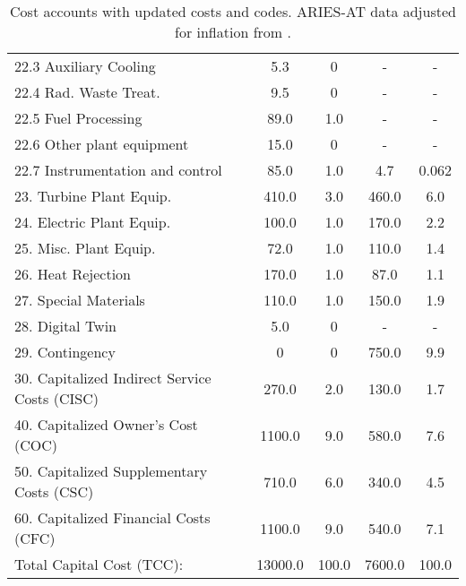 \begin{table}[h!]
{\begin{tabular}{lcccc}
\hspace{10mm}22.3 Auxiliary Cooling & 5.3 & 0 & - & - \\
\hspace{10mm}22.4 Rad. Waste Treat. & 9.5 & 0 & - & - \\
\hspace{10mm}22.5 Fuel Processing & 89.0 & 1.0 & - & - \\
\hspace{10mm}22.6 Other plant equipment & 15.0 & 0 & - & - \\
\hspace{10mm}22.7 Instrumentation and control & 85.0 & 1.0 & 4.7 & 0.062 \\
\hspace{5mm}23. Turbine Plant Equip. & 410.0 & 3.0 & 460.0 & 6.0 \\
\hspace{5mm}24. Electric Plant Equip. & 100.0 & 1.0 & 170.0 & 2.2 \\
\hspace{5mm}25. Misc. Plant Equip. & 72.0 & 1.0 & 110.0 & 1.4 \\
\hspace{5mm}26. Heat Rejection & 170.0 & 1.0 & 87.0 & 1.1 \\
\hspace{5mm}27. Special Materials & 110.0 & 1.0 & 150.0 & 1.9 \\
\hspace{5mm}28. Digital Twin & 5.0 & 0 & - & - \\
\hspace{5mm}29. Contingency & 0 & 0 & 750.0 & 9.9 \\
30. Capitalized Indirect Service Costs (CISC) & 270.0 & 2.0 & 130.0 & 1.7 \\
40. Capitalized Owner’s Cost (COC) & 1100.0 & 9.0 & 580.0 & 7.6 \\
50. Capitalized Supplementary Costs (CSC) & 710.0 & 6.0 & 340.0 & 4.5 \\
60. Capitalized Financial Costs (CFC) & 1100.0 & 9.0 & 540.0 & 7.1 \\
\hline
Total Capital Cost (TCC): & 13000.0 & 100.0 & 7600.0 & 100.0 \\
\hline
\end{tabular}
}
\caption{Cost accounts with updated costs and codes. ARIES-AT data adjusted for inflation from \cite{gordon1986mirror}.}
\label{tab:costs_updated_codes}
\end{table}


